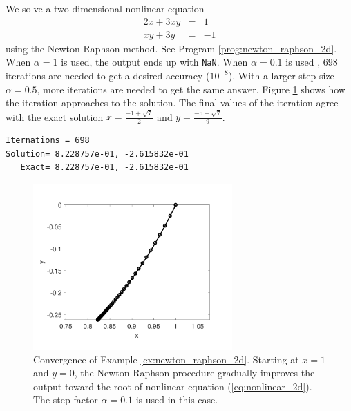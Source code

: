 \bigskip
\begin{example}\label{ex:newton_raphson_2d}

We solve a two-dimensional nonlinear equation
\begin{subequations}
\begin{eqnarray}
2 x + 3 x y &=& 1\\
x y + 3 y &=& -1
\end{eqnarray}\label{eq:nonlinear_2d}
\end{subequations}
using the Newton-Raphson method. See  Program \ref{prog:newton_raphson_2d}.  When $\alpha=1$ is used, the output ends up with \texttt{NaN}.  When $\alpha=0.1$ is used , 698 iterations are needed to get a desired accuracy ($10^{-8}$).  With a larger step size $\alpha=0.5$, more iterations are needed to get the same answer.   Figure \ref{fig:newton_raphson_2d} shows how the iteration approaches to the solution.   The final values of the iteration agree with the exact solution $x=\displaystyle\frac{-1+\sqrt{7}}{2}$ and $y=\displaystyle\frac{-5+\sqrt{7}}{9}$.
 

\begin{mybox}

\small
\begin{verbatim}
Iternations = 698
Solution= 8.228757e-01, -2.615832e-01
   Exact= 8.228757e-01, -2.615832e-01
\end{verbatim}
\normalsize
\end{mybox}

\begin{figure}
\centering
\includegraphics[width=3in]{09.matrix2/newton_raphson_2d.pdf}
\caption{Convergence of Example \ref{ex:newton_raphson_2d}. Starting at $x=1$ and $y=0$, the Newton-Raphson procedure gradually improves the output toward the root of nonlinear equation (\ref{eq:nonlinear_2d}).  The step factor $\alpha=0.1$ is used in this case.}
\label{fig:newton_raphson_2d}
\end{figure}

\end{example}


